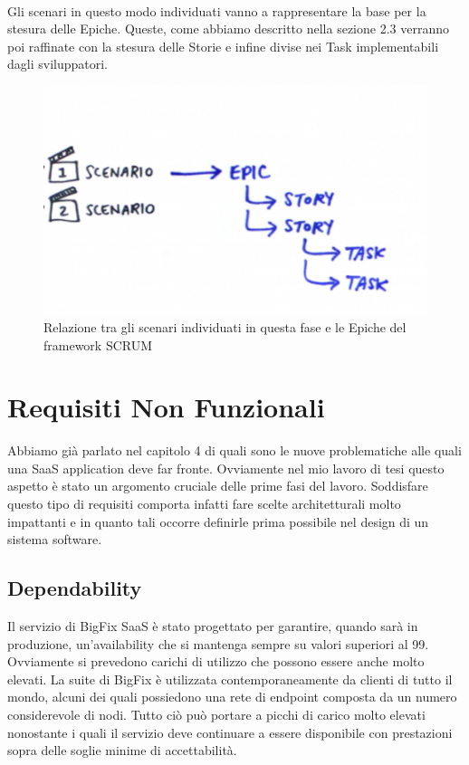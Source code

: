 \paragraph{}
Gli scenari in questo modo individuati vanno a rappresentare la base per la stesura delle Epiche. Queste, come abbiamo descritto nella sezione 2.3 verranno poi raffinate con la stesura delle Storie e infine divise nei Task implementabili dagli sviluppatori.
\begin{figure} [h!]
	\centering
	\includegraphics[width=0.7\linewidth]{capitoli/imgs/scenario.PNG}
	\caption{Relazione tra gli scenari individuati in questa fase e le Epiche del framework SCRUM}
	\label{fig:scentospic}
\end{figure}

\section{Requisiti Non Funzionali}
Abbiamo già parlato nel capitolo 4 di quali sono le nuove problematiche alle quali una SaaS application deve far fronte. Ovviamente nel mio lavoro di tesi questo aspetto è stato un argomento cruciale delle prime fasi del lavoro. Soddisfare questo tipo di requisiti comporta infatti fare scelte architetturali molto impattanti e in quanto tali occorre definirle prima possibile nel design di un sistema software. 

\subsection{Dependability}
Il servizio di BigFix SaaS è stato progettato per garantire, quando sarà in produzione, un'availability che si mantenga sempre su valori superiori al 99. Ovviamente si prevedono carichi di utilizzo che possono essere anche molto elevati. La suite di BigFix è utilizzata contemporaneamente da clienti di tutto il mondo, alcuni dei quali possiedono una rete di endpoint composta da un numero considerevole di nodi. Tutto ciò può portare a picchi di carico molto elevati nonostante i quali il servizio deve continuare a essere disponibile con prestazioni sopra delle soglie minime di accettabilità.

